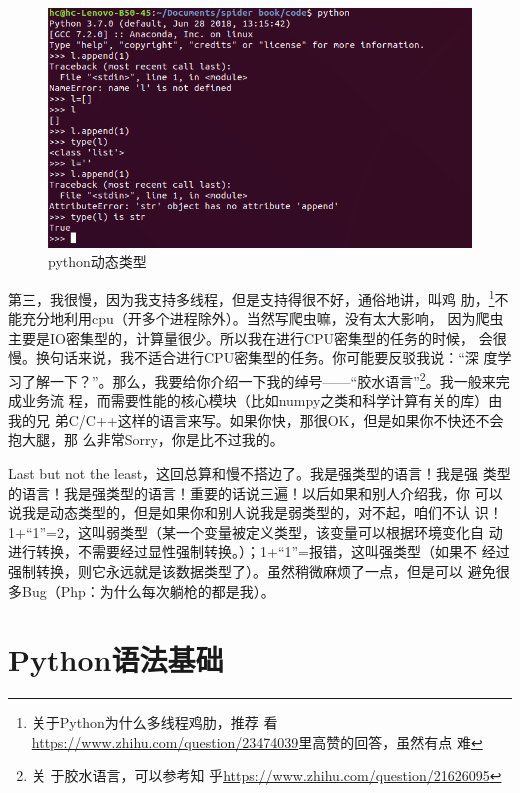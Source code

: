 \documentclass[11pt,UTF8,oneside]{mybook}
\begin{document}
\begin{figure}[htb]
  \centering \includegraphics[width=\textwidth]{./figure/type.png}
  \caption{python动态类型}
  \label{fig:type}
\end{figure}

第三，我很慢，因为我支持多线程，但是支持得很不好，通俗地讲，叫鸡
肋，\footnote{关于Python为什么多线程鸡肋，推荐
  看\url{https://www.zhihu.com/question/23474039}里高赞的回答，虽然有点
  难}不能充分地利用cpu（开多个进程除外）。当然写爬虫嘛，没有太大影响，
因为爬虫主要是IO密集型的，计算量很少。所以我在进行CPU密集型的任务的时候，
会很慢。换句话来说，我不适合进行CPU密集型的任务。你可能要反驳我说：“深
度学习了解一下？”。那么，我要给你介绍一下我的绰号——“胶水语言”\footnote{关
  于胶水语言，可以参考知
  乎\url{https://www.zhihu.com/question/21626095}}。我一般来完成业务流
程，而需要性能的核心模块（比如numpy之类和科学计算有关的库）由我的兄
弟C/C++这样的语言来写。如果你快，那很OK，但是如果你不快还不会抱大腿，那
么非常Sorry，你是比不过我的。

Last but not the least，这回总算和慢不搭边了。我是强类型的语言！我是强
类型的语言！我是强类型的语言！重要的话说三遍！以后如果和别人介绍我，你
可以说我是动态类型的，但是如果你和别人说我是弱类型的，对不起，咱们不认
识！1+“1”=2，这叫弱类型（某一个变量被定义类型，该变量可以根据环境变化自
动进行转换，不需要经过显性强制转换。）；1+“1”=报错，这叫强类型（如果不
经过强制转换，则它永远就是该数据类型了）。虽然稍微麻烦了一点，但是可以
避免很多Bug（Php：为什么每次躺枪的都是我）。



\chapter{Python语法基础}
\label{chap:programmar}
\end{document}
